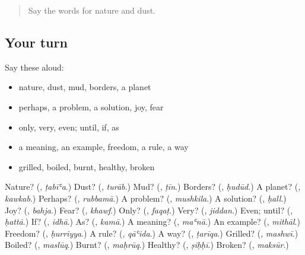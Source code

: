 \begin{quote}
Say the words for nature and dust.
\end{quote}

\subsection*{Your turn}
Say these aloud:

\begin{itemize}
\raggedright
  \item nature, dust, mud, borders, a planet
  \item perhaps, a problem, a solution, joy, fear
  \item only, very, even; until, if, as
  \item a meaning, an example, freedom, a rule, a way
  \item grilled, boiled, burnt, healthy, broken
\end{itemize}

\begin{tcolorbox}[breakable,colback=teal!4,colframe=teal!35!black,title={Before you move on}]
Nature? (\textbf{}, \emph{ṭabīʿa}.) Dust? (\textbf{}, \emph{turāb}.) Mud? (\textbf{}, \emph{ṭīn}.) Borders? (\textbf{}, \emph{ḥudūd}.) A planet? (\textbf{}, \emph{kawkab}.) Perhaps? (\textbf{}, \emph{rubbamā}.) A problem? (\textbf{}, \emph{mushkila}.) A solution? (\textbf{}, \emph{ḥall}.) Joy? (\textbf{}, \emph{bahja}.) Fear? (\textbf{}, \emph{khawf}.) Only? (\textbf{}, \emph{faqaṭ}.) Very? (\textbf{}, \emph{jiddan}.) Even; until? (\textbf{}, \emph{ḥattā}.) If? (\textbf{}, \emph{idhā}.) As? (\textbf{}, \emph{kamā}.) A meaning? (\textbf{}, \emph{maʿnā}.) An example? (\textbf{}, \emph{mithāl}.) Freedom? (\textbf{}, \emph{ḥurriyya}.) A rule? (\textbf{}, \emph{qāʿida}.) A way? (\textbf{}, \emph{ṭarīqa}.) Grilled? (\textbf{}, \emph{mashwī}.) Boiled? (\textbf{}, \emph{maslūq}.) Burnt? (\textbf{}, \emph{maḥrūq}.) Healthy? (\textbf{}, \emph{ṣiḥḥī}.) Broken? (\textbf{}, \emph{maksūr}.)
\end{tcolorbox}
